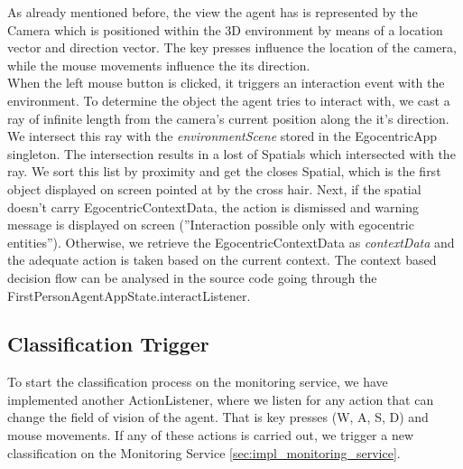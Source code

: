 As already mentioned before, the view the agent has is represented by the Camera which is positioned within the 3D environment by means of a location vector and direction vector. The key presses influence the location of the camera, while the mouse movements influence the its direction.\\

When the left mouse button is clicked, it triggers an interaction event with the environment. To determine the object the agent tries to interact with, we cast a ray of infinite length from the camera's current position along the it's direction. We intersect this ray with the \emph{environmentScene} stored in the EgocentricApp singleton. The intersection results in a lost of Spatials which intersected with the ray. We sort this list by proximity and get the closes Spatial, which is the first object displayed on screen pointed at by the cross hair. Next, if the spatial doesn't carry EgocentricContextData, the action is dismissed and warning message is displayed on screen (''Interaction possible only with egocentric entities''). Otherwise, we retrieve the EgocentricContextData as \emph{contextData} and the adequate action is taken based on the current context. The context based decision flow can be analysed in the source code going through the FirstPersonAgentAppState.interactListener.\\

\subsection{Classification Trigger} %
\label{subsec:impl_classification_trigger}
To start the classification process on the monitoring service, we have implemented another ActionListener, where we listen for any action that can change the field of vision of the agent. That is key presses (W, A, S, D) and mouse movements. If any of these actions is carried out, we trigger a new classification on the Monitoring Service \ref{sec:impl_monitoring_service}.

